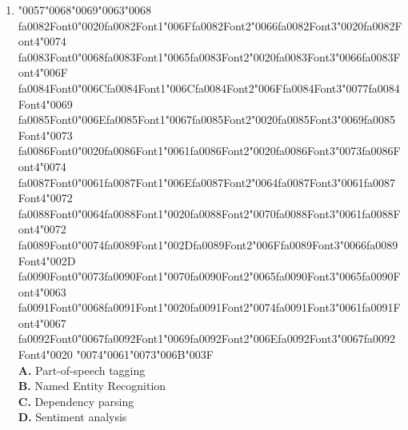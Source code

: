 \documentclass[11pt]{article}
\begin{document}
\begin{enumerate}[label=Q\arabic*., leftmargin=*]
\item {\char"0057}{\char"0068}{\char"0069}{\char"0063}{\char"0068} {\csname fa0082Font0\endcsname\char"0020}{\csname fa0082Font1\endcsname\char"006F}{\csname fa0082Font2\endcsname\char"0066}{\csname fa0082Font3\endcsname\char"0020}{\csname fa0082Font4\endcsname\char"0074} {\csname fa0083Font0\endcsname\char"0068}{\csname fa0083Font1\endcsname\char"0065}{\csname fa0083Font2\endcsname\char"0020}{\csname fa0083Font3\endcsname\char"0066}{\csname fa0083Font4\endcsname\char"006F} {\csname fa0084Font0\endcsname\char"006C}{\csname fa0084Font1\endcsname\char"006C}{\csname fa0084Font2\endcsname\char"006F}{\csname fa0084Font3\endcsname\char"0077}{\csname fa0084Font4\endcsname\char"0069} {\csname fa0085Font0\endcsname\char"006E}{\csname fa0085Font1\endcsname\char"0067}{\csname fa0085Font2\endcsname\char"0020}{\csname fa0085Font3\endcsname\char"0069}{\csname fa0085Font4\endcsname\char"0073} {\csname fa0086Font0\endcsname\char"0020}{\csname fa0086Font1\endcsname\char"0061}{\csname fa0086Font2\endcsname\char"0020}{\csname fa0086Font3\endcsname\char"0073}{\csname fa0086Font4\endcsname\char"0074} {\csname fa0087Font0\endcsname\char"0061}{\csname fa0087Font1\endcsname\char"006E}{\csname fa0087Font2\endcsname\char"0064}{\csname fa0087Font3\endcsname\char"0061}{\csname fa0087Font4\endcsname\char"0072} {\csname fa0088Font0\endcsname\char"0064}{\csname fa0088Font1\endcsname\char"0020}{\csname fa0088Font2\endcsname\char"0070}{\csname fa0088Font3\endcsname\char"0061}{\csname fa0088Font4\endcsname\char"0072} {\csname fa0089Font0\endcsname\char"0074}{\csname fa0089Font1\endcsname\char"002D}{\csname fa0089Font2\endcsname\char"006F}{\csname fa0089Font3\endcsname\char"0066}{\csname fa0089Font4\endcsname\char"002D} {\csname fa0090Font0\endcsname\char"0073}{\csname fa0090Font1\endcsname\char"0070}{\csname fa0090Font2\endcsname\char"0065}{\csname fa0090Font3\endcsname\char"0065}{\csname fa0090Font4\endcsname\char"0063} {\csname fa0091Font0\endcsname\char"0068}{\csname fa0091Font1\endcsname\char"0020}{\csname fa0091Font2\endcsname\char"0074}{\csname fa0091Font3\endcsname\char"0061}{\csname fa0091Font4\endcsname\char"0067} {\csname fa0092Font0\endcsname\char"0067}{\csname fa0092Font1\endcsname\char"0069}{\csname fa0092Font2\endcsname\char"006E}{\csname fa0092Font3\endcsname\char"0067}{\csname fa0092Font4\endcsname\char"0020} {\char"0074}{\char"0061}{\char"0073}{\char"006B}{\char"003F}\\[0.25em]
\textbf{A.} Part-of-speech tagging\\
\textbf{B.} Named Entity Recognition\\
\textbf{C.} Dependency parsing\\
\textbf{D.} Sentiment analysis


\end{enumerate}
\end{document}
